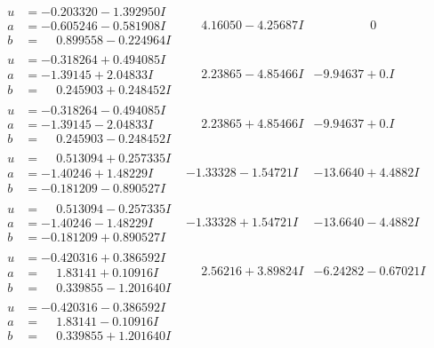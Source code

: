 \documentclass[1p]{elsarticle_modified}
\theoremstyle{definition}
\begin{document}
$$\begin{array}{c|c|c}
\begin{aligned}
u &= -0.203320 - 1.392950 I \\
a &= -0.605246 - 0.581908 I \\
b &= \phantom{-}0.899558 - 0.224964 I\end{aligned}
 & \phantom{-}4.16050 - 4.25687 I & \phantom{-0.000000 } 0 \\ \hline\begin{aligned}
u &= -0.318264 + 0.494085 I \\
a &= -1.39145 + 2.04833 I \\
b &= \phantom{-}0.245903 + 0.248452 I\end{aligned}
 & \phantom{-}2.23865 - 4.85466 I & -9.94637 + 0. I\phantom{ +0.000000I} \\ \hline\begin{aligned}
u &= -0.318264 - 0.494085 I \\
a &= -1.39145 - 2.04833 I \\
b &= \phantom{-}0.245903 - 0.248452 I\end{aligned}
 & \phantom{-}2.23865 + 4.85466 I & -9.94637 + 0. I\phantom{ +0.000000I} \\ \hline\begin{aligned}
u &= \phantom{-}0.513094 + 0.257335 I \\
a &= -1.40246 + 1.48229 I \\
b &= -0.181209 - 0.890527 I\end{aligned}
 & -1.33328 - 1.54721 I & -13.6640 + 4.4882 I \\ \hline\begin{aligned}
u &= \phantom{-}0.513094 - 0.257335 I \\
a &= -1.40246 - 1.48229 I \\
b &= -0.181209 + 0.890527 I\end{aligned}
 & -1.33328 + 1.54721 I & -13.6640 - 4.4882 I \\ \hline\begin{aligned}
u &= -0.420316 + 0.386592 I \\
a &= \phantom{-}1.83141 + 0.10916 I \\
b &= \phantom{-}0.339855 - 1.201640 I\end{aligned}
 & \phantom{-}2.56216 + 3.89824 I & -6.24282 - 0.67021 I \\ \hline\begin{aligned}
u &= -0.420316 - 0.386592 I \\
a &= \phantom{-}1.83141 - 0.10916 I \\
b &= \phantom{-}0.339855 + 1.201640 I\end{aligned}

\end{array}$$
\end{document}
